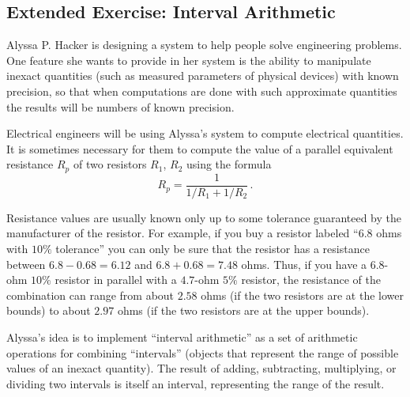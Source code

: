 \subsection{Extended Exercise: Interval Arithmetic}
\label{Section 2.1.4}

Alyssa P. Hacker is designing a system to help people solve engineering problems.
One feature she wants to provide in her system is the ability to manipulate inexact quantities (such as measured parameters of physical devices) with known precision, so that when computations are done with such approximate quantities the results will be numbers of known precision.

Electrical engineers will be using Alyssa’s system to compute electrical quantities.
It is sometimes necessary for them to compute the value of a parallel equivalent resistance \( R_p \) of two resistors \( R_1 \), \( R_2 \) using the formula
\[
	R_p = \frac{1}{1 / R_1 + 1 / R_2} \,.
\]

Resistance values are usually known only up to some tolerance guaranteed by the manufacturer of the resistor.
For example, if you buy a resistor labeled “\( 6.8 \) ohms with \( 10\% \) tolerance” you can only be sure that the resistor has a resistance between \( 6.8 - 0.68 = 6.12 \) and \( 6.8 + 0.68 = 7.48 \) ohms.
Thus, if you have a \( 6.8 \)-ohm \( 10\% \) resistor in parallel with a \( 4.7 \)-ohm \( 5\% \) resistor, the resistance of the combination can range from about \( 2.58 \) ohms (if the two resistors are at the lower bounds) to about \( 2.97 \) ohms (if the two resistors are at the upper bounds).

Alyssa’s idea is to implement “interval arithmetic” as a set of arithmetic operations for combining “intervals” (objects that represent the range of possible values of an inexact quantity).
The result of adding, subtracting, multiplying, or dividing two intervals is itself an interval, representing the range of the result.


